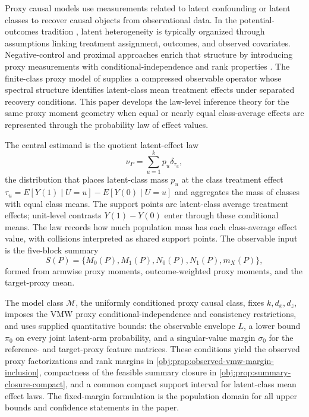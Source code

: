 Proxy causal models use measurements related to latent confounding or latent classes to recover causal objects from observational data.  In the potential-outcomes tradition \citep{Neyman1990,Rubin1974,Holland1986,ImbensRubin2015}, latent heterogeneity is typically organized through assumptions linking treatment assignment, outcomes, and observed covariates.  Negative-control and proximal approaches enrich that structure by introducing proxy measurements with conditional-independence and rank properties \citep{MiaoGengTchetgen2018,ShiMiaoNelsonTchetgen2020,TchetgenTchetgen2024,CuiPuShiMiaoTchetgen2024,MiaoHuOgburnZhou2023,QiMiaoZhang2024,LiuParkLiTchetgen2024,LiLindermanShiTchetgen2024,AiShan2025,SahaBatesShah2026}.  The finite-class proxy model of \citet{VirkMazaheriWu2026} supplies a compressed observable operator whose spectral structure identifies latent-class mean treatment effects under separated recovery conditions.  This paper develops the law-level inference theory for the same proxy moment geometry when equal or nearly equal class-average effects are represented through the probability law of effect values.

The central estimand is the quotient latent-effect law
\[
\nu_P=\sum_{u=1}^k p_u\delta_{\tau_u},
\]
the distribution that places latent-class mass \(p_u\) at the class treatment effect \(\tau_u=E[Y(1)\mid U=u]-E[Y(0)\mid U=u]\) and aggregates the mass of classes with equal class means.  The support points are latent-class average treatment effects; unit-level contrasts \(Y(1)-Y(0)\) enter through these conditional means.  The law records how much population mass has each class-average effect value, with collisions interpreted as shared support points.  The observable input is the five-block summary
\[
S(P)=\{M_0(P),M_1(P),N_0(P),N_1(P),m_X(P)\},
\]
formed from armwise proxy moments, outcome-weighted proxy moments, and the target-proxy mean.

The model class \(\mathcal M\), the uniformly conditioned proxy causal class, fixes \(k,d_x,d_z\), imposes the VMW proxy conditional-independence and consistency restrictions, and uses supplied quantitative bounds: the observable envelope \(L\), a lower bound \(\pi_0\) on every joint latent-arm probability, and a singular-value margin \(\sigma_0\) for the reference- and target-proxy feature matrices.  These conditions yield the observed proxy factorizations and rank margins in \cref{obj:prop:observed-vmw-margin-inclusion}, compactness of the feasible summary closure in \cref{obj:prop:summary-closure-compact}, and a common compact support interval for latent-class mean effect laws.  The fixed-margin formulation is the population domain for all upper bounds and confidence statements in the paper.

